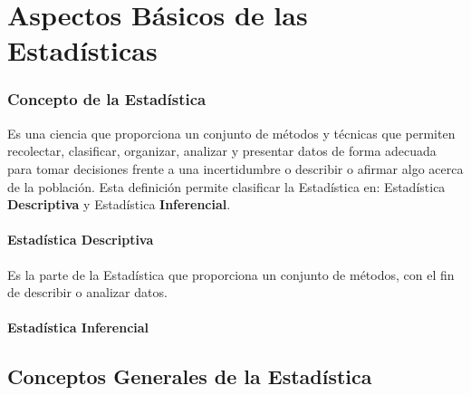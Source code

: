 \chapter{Aspectos Básicos de las Estadísticas}
\subsection*{Concepto de la Estadística}
Es una ciencia que proporciona un conjunto de métodos y técnicas que permiten recolectar, clasificar, organizar, analizar y presentar datos de forma adecuada para tomar decisiones frente a una incertidumbre o describir o afirmar algo acerca de la población. Esta definición permite clasificar la Estadística en: Estadística \textbf{Descriptiva} y Estadística \textbf{Inferencial}.
\subsubsection*{Estadística Descriptiva}
Es la parte de la Estadística que proporciona un conjunto de métodos, con el fin de describir o analizar datos.
\subsubsection*{Estadística Inferencial}
\section{Conceptos Generales de la Estadística}
